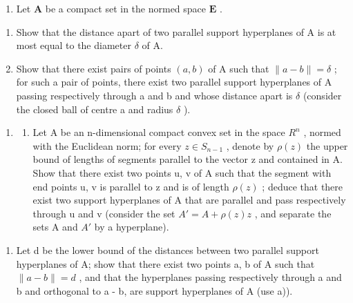 \begin{enumerate}
\def\labelenumi{\arabic{enumi})}
\setcounter{enumi}{14}
\tightlist
\item
  Let \(\mathbf{A}\) be a compact set in the normed space \(\mathbf{E}\) .
\end{enumerate}

\begin{enumerate}
\def\labelenumi{\alph{enumi})}
\item
  Show that the distance apart of two parallel support hyperplanes of A is at most equal to the diameter \(\delta\) of A.
\item
  Show that there exist pairs of points \((a, b)\) of A such that \(\|a - b\| = \delta\) ; for such a pair of points, there exist two parallel support hyperplanes of A passing respectively through a and b and whose distance apart is \(\delta\) (consider the closed ball of centre a and radius \(\delta\) ).
\end{enumerate}

\begin{enumerate}
\def\labelenumi{\arabic{enumi})}
\setcounter{enumi}{15}
\tightlist
\item
  \begin{enumerate}
  \def\labelenumii{\alph{enumii})}
  \tightlist
  \item
    Let A be an n-dimensional compact convex set in the space \(R^{n}\) , normed with the Euclidean norm; for every \(z \in S_{n-1}\) , denote by \(\rho(z)\) the upper bound of lengths of segments parallel to the vector z and contained in A. Show that there exist two points u, v of A such that the segment with end points u, v is parallel to z and is of length \(\rho(z)\) ; deduce that there exist two support hyperplanes of A that are parallel and pass respectively through u and v (consider the set \(A' = A + \rho(z)z\) , and separate the sets A and \(A'\) by a hyperplane).
  \end{enumerate}
\end{enumerate}

\begin{enumerate}
\def\labelenumi{\alph{enumi})}
\setcounter{enumi}{1}
\tightlist
\item
  Let d be the lower bound of the distances between two parallel support hyperplanes of A; show that there exist two points a, b of A such that \(\|a - b\| = d\) , and that the hyperplanes passing respectively through a and b and orthogonal to a - b, are support hyperplanes of A (use a)).
\end{enumerate}

